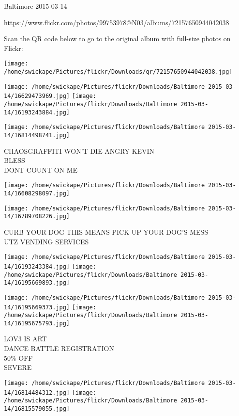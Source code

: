 \documentclass[10pt,letterpaper]{article}
\begin{document}
Baltimore 2015-03-14

https://www.flickr.com/photos/99753978@N03/albums/72157650944042038

Scan the QR code below to go to the original album with full-size photos on Flickr:

\texttt{[image: /home/swickape/Pictures/flickr/Downloads/qr/72157650944042038.jpg]}
\pagebreak

\texttt{[image: /home/swickape/Pictures/flickr/Downloads/Baltimore 2015-03-14/16629473969.jpg]}
\texttt{[image: /home/swickape/Pictures/flickr/Downloads/Baltimore 2015-03-14/16193243884.jpg]}

\vspace{0.25in}
\texttt{[image: /home/swickape/Pictures/flickr/Downloads/Baltimore 2015-03-14/16814498741.jpg]}

CHAOSGRAFFITI WON'T DIE ANGRY KEVIN\\
BLESS\\
DONT COUNT ON ME\\
\pagebreak

\texttt{[image: /home/swickape/Pictures/flickr/Downloads/Baltimore 2015-03-14/16608298097.jpg]}

\vspace{0.25in}
\texttt{[image: /home/swickape/Pictures/flickr/Downloads/Baltimore 2015-03-14/16789708226.jpg]}

CURB YOUR DOG THIS MEANS PICK UP YOUR DOG'S MESS\\
UTZ VENDING SERVICES\\
\pagebreak

\texttt{[image: /home/swickape/Pictures/flickr/Downloads/Baltimore 2015-03-14/16193243384.jpg]}
\texttt{[image: /home/swickape/Pictures/flickr/Downloads/Baltimore 2015-03-14/16195669893.jpg]}

\texttt{[image: /home/swickape/Pictures/flickr/Downloads/Baltimore 2015-03-14/16195669373.jpg]}
\texttt{[image: /home/swickape/Pictures/flickr/Downloads/Baltimore 2015-03-14/16195675793.jpg]}

LOV3 IS ART\\
DANCE BATTLE REGISTRATION\\
50\% OFF\\
SEVERE\\
\pagebreak

\texttt{[image: /home/swickape/Pictures/flickr/Downloads/Baltimore 2015-03-14/16814484312.jpg]}
\texttt{[image: /home/swickape/Pictures/flickr/Downloads/Baltimore 2015-03-14/16815579055.jpg]}
\end{document}
